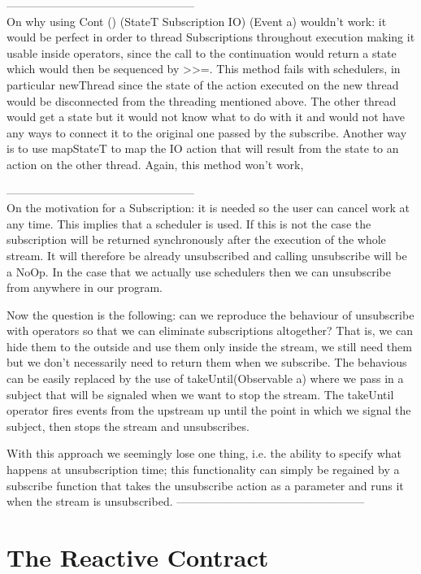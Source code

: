 
--------------------------------------------------\\
On why using Cont () (StateT Subscription IO) (Event a) wouldn't work: it would be perfect in order to thread Subscriptions throughout execution making it usable inside operators, since the call to the continuation would return a state which would then be sequenced by >>=. This method fails with schedulers, in particular newThread since the state of the action executed on the new thread would be disconnected from the threading mentioned above. The other thread would get a state but it would not know what to do with it and would not have any ways to connect it to the original one passed by the subscribe. Another way is to use mapStateT to map the IO action that will result from the state to an action on the other thread. Again, this method won't work, 

--------------------------------------------------\\
On the motivation for a Subscription: it is needed so the user can cancel work at any time. This implies that a scheduler is used. If this is not the case the subscription will be returned synchronously after the execution of the whole stream. It will therefore be already unsubscribed and calling unsubscribe will be a NoOp. In the case that we actually use schedulers then we can unsubscribe from anywhere in our program. 

Now the question is the following: can we reproduce the behaviour of unsubscribe with operators so that we can eliminate subscriptions altogether? That is, we can hide them to the outside and use them only inside the stream, we still need them but we don't necessarily need to return them when we subscribe. The behavious can be easily replaced by the use of takeUntil(Observable a) where we pass in a subject that will be signaled when we want to stop the stream. The takeUntil operator fires events from the upstream up until the point in which we signal the subject, then stops the stream and unsubscribes. 

With this approach we seemingly lose one thing, i.e. the ability to specify what happens at unsubscription time; this functionality can simply be regained by a subscribe function that takes the unsubscribe action as a parameter and runs it when the stream is unsubscribed.
--------------------------------------------------





\section{The Reactive Contract}